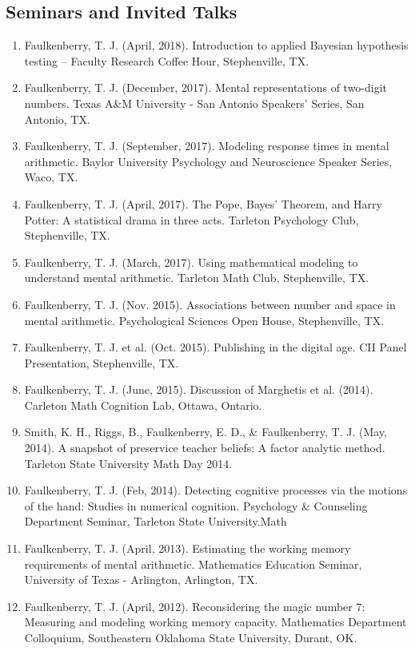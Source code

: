 \documentclass[article,10pt]{article}
\begin{document}
\subsection*{Seminars and Invited Talks}
\label{sec:org2f45fb7}
\begin{enumerate}
\item Faulkenberry, T. J. (April, 2018). Introduction to applied Bayesian hypothesis testing -- Faculty Research Coffee Hour, Stephenville, TX.
\item Faulkenberry, T. J. (December, 2017). Mental representations of two-digit numbers. Texas A\&M University - San Antonio Speakers' Series, San Antonio, TX.
\item Faulkenberry, T. J. (September, 2017). Modeling response times in mental arithmetic. Baylor University Psychology and Neuroscience Speaker Series, Waco, TX.
\item Faulkenberry, T. J. (April, 2017). The Pope, Bayes' Theorem, and Harry Potter: A statistical drama in three acts.  Tarleton Psychology Club, Stephenville, TX.
\item Faulkenberry, T. J. (March, 2017). Using mathematical modeling to understand mental arithmetic. Tarleton Math Club, Stephenville, TX.
\item Faulkenberry, T. J. (Nov. 2015). Associations between number and space in mental arithmetic.  Psychological Sciences Open House, Stephenville, TX.
\item Faulkenberry, T. J. et al. (Oct. 2015). Publishing in the digital age.  CII Panel Presentation, Stephenville, TX.
\item Faulkenberry, T. J. (June, 2015). Discussion of Marghetis et al. (2014). Carleton Math Cognition Lab, Ottawa, Ontario.
\item Smith, K. H., Riggs, B., Faulkenberry, E. D., \& Faulkenberry, T. J. (May, 2014). A snapshot of preservice teacher beliefs: A factor analytic method. Tarleton State University Math Day 2014.
\item Faulkenberry, T. J. (Feb, 2014). Detecting cognitive processes via the motions of the hand: Studies in numerical cognition.  Psychology \& Counseling Department Seminar, Tarleton State University.Math
\item Faulkenberry, T. J. (April, 2013). Estimating the working memory requirements of mental arithmetic. Mathematics Education Seminar, University of Texas - Arlington, Arlington, TX.
\item Faulkenberry, T. J. (April, 2012). Reconsidering the magic number 7: Measuring and modeling working memory capacity. Mathematics Department Colloquium, Southeastern Oklahoma State University, Durant, OK.

\end{enumerate}
\end{document}
